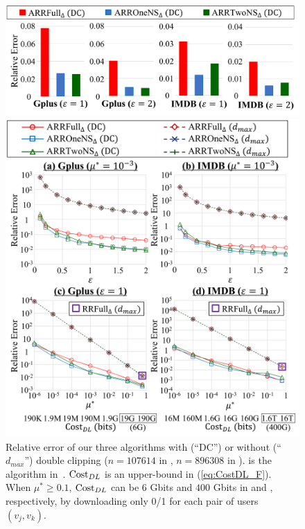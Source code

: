 \begin{figure}[t]
  \centering
  \includegraphics[width=0.96\linewidth]{fig/res2_w_Lap_abst2.pdf}
  \vspace{-6mm}
  \caption{Relative error of our three algorithms with double clipping (``DC'') when $\epsilon=1$ or $2$ and %
  $\mu^*=10^{-3}$ 
  ($n=107614$ in \GPlus{}, $n=896308$ in \IMDB{}).} 
  \label{fig:res2_w_Lap_abst}
 \vspace{1mm}
  \centering
  \includegraphics[width=0.99\linewidth]{fig/res2_w_Lap.pdf}
  \vspace{-5mm}
  \caption{Relative error of our three algorithms with (``DC'') or without (``$d_{max}$'') double clipping ($n=107614$ in \GPlus{}, $n=896308$ in \IMDB{}). \AlgSec{} is the 
  algorithm in~\cite{Imola_USENIX21}. 
  $\mathrm{Cost}_{DL}$ is 
  an upper-bound in 
  (\ref{eq:CostDL_F}). 
  When $\mu^* \geq 0.1$, 
  $\mathrm{Cost}_{DL}$ can be $6$ Gbits and $400$ Gbits in \GPlus{} and \IMDB{}, respectively, by downloading only 0/1 for each pair of users $(v_j,v_k)$.} 
  \label{fig:res2_w_Lap}
\end{figure}

